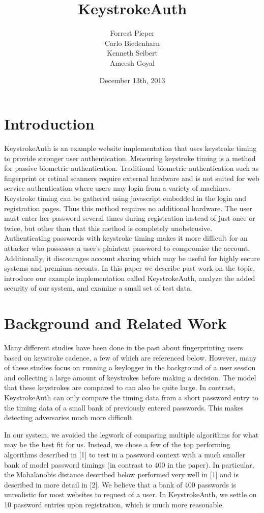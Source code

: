 \documentclass{article}
\title{KeystrokeAuth}
\author{
  Forrest Pieper\\
  Carlo Biedenharn\\
  Kenneth Seibert\\
  Ameesh Goyal
}
\date{December 13th, 2013}
\begin{document}
\maketitle

\abstract{
}

\section{Introduction}
\label{introduction}
KeystrokeAuth is an example website implementation that uses keystroke timing to provide stronger user authentication.
Measuring keystroke timing is a method for passive biometric authentication. 
Traditional biometric authentication such as fingerprint or retinal scanners require external hardware and is not suited for web service authentication where users may login from a variety of machines. 
Keystroke timing can be gathered using javascript embedded in the login and registration pages.
Thus this method requires no additional hardware.
The user must enter her password several times during registration instead of just once or twice, but other than that this method is completely unobstrusive.
Authenticating passwords with keystroke timing makes it more difficult for an attacker who possesses a user's plaintext password to compromise the account.
Additionally, it discourages account sharing which may be useful for highly secure systems and premium acconts.
In this paper we describe past work on the topic, introduce our example implementation called KeystrokeAuth, analyze the added security of our system, and examine a small set of test data.

\section{Background and Related Work}

Many different studies have been done in the past about fingerprinting users based on keystroke cadence, a few of which are referenced below. However, many of these studies focus on running a keylogger in the background of a user session and collecting a large amount of keystrokes before making a decision. The model that these keystrokes are compared to can also be quite large. In contrast, KeystrokeAuth can only compare the timing data from a short password entry to the timing data of a small bank of previously entered passwords. This makes detecting adversaries much more difficult.

In our system, we avoided the legwork of comparing multiple algorithms for what may be the best fit for us. Instead, we chose a few of the top performing algorithms described in {[}1{]} to test in a password context with a much smaller bank of model password timings (in contrast to 400 in the paper). In particular, the Mahalanobis distance described below performed very well in {[}1{]} and is described in more detail in {[}2{]}. We believe that a bank of 400 passwords is unrealistic for most websites to request of a user. In KeystrokeAuth, we settle on 10 password entries upon registration, which is much more reasonable. 
\end{document}
